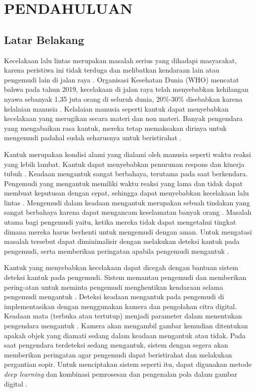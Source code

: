 \chapter{PENDAHULUAN}
\pagestyle{plain}
\section{Latar Belakang}

    Kecelakaan lalu lintas merupakan masalah serius yang dihadapi masyarakat, karena peristiwa ini tidak terduga dan melibatkan kendaraan lain atau pengemudi lain di jalan raya \cite{himawan2022deteksi}. Organisasi Kesehatan Dunia (WHO) mencatat bahwa pada tahun 2019, kecelakaan di jalan raya telah menyebabkan kehilangan nyawa sebanyak 1,35 juta orang di seluruh dunia, 20\%-30\% disebabkan karena kelalaian manusia \cite{kojo2024analisis}. Kelalaian manusia seperti kantuk dapat menyebabkan kecelakaan yang merugikan secara materi dan non materi. Banyak pengendara yang mengabaikan rasa kantuk, mereka tetap memaksakan dirinya untuk mengemudi padahal sudah seharusnya untuk beristirahat   \cite{Puteri2020}.

    Kantuk merupakan kondisi alami yang dialami oleh manusia seperti waktu reaksi yang lebih lambat. Kantuk dapat menyebabkan penurunan respons dan kinerja tubuh \cite{Chaabene2021}. Keadaan mengantuk sangat berbahaya, terutama pada saat berkendara. Pengemudi yang mengantuk memiliki waktu reaksi yang lama dan tidak dapat membuat keputusan dengan cepat, sehingga dapat menyebabkan kecelakaan lalu lintas \cite{Cui2021}. Mengemudi dalam keadaan mengantuk merupakan sebuah tindakan yang sangat berbahaya karena dapat mengancam keselamatan banyak orang \cite{Ngxande2017}. Masalah utama bagi pengemudi yaitu, ketika mereka tidak dapat mengetahui tingkat dimana mereka harus berhenti untuk mengemudi dengan aman. Untuk mengatasi masalah tersebut dapat diminimalisir dengan melakukan deteksi kantuk pada pengemudi, serta memberikan peringatan apabila pengemudi mengantuk \cite{Zhu2022}. 

    Kantuk yang menyebabkan kecelakaan dapat dicegah dengan bantuan sistem deteksi kantuk pada pengemudi. Sistem memantau pengemudi dan memberikan pering-atan untuk meminta pengemudi menghentikan kendaraan selama pengemudi mengantuk \cite{Cui2021}. Deteksi keadaan mengantuk pada pengemudi di implementasikan dengan menggunakan kamera dan pengolahan citra digital. Keadaan mata (terbuka atau tertutup) menjadi parameter dalam menentukan pengendara mengantuk \cite{sethu2023application}. Kamera akan mengambil gambar kemudian ditentukan apakah objek yang diamati sedang dalam keadaan mengantuk atau tidak. Pada saat pengendara terdeteksi sedang mengantuk, sistem dengan segera akan memberikan peringatan agar pengemudi dapat beristirahat dan melakukan pergantian sopir. Untuk menciptakan sistem seperti itu, dapat digunakan metode \textit{deep learning} dan kombinasi pemrosesan dan pengenalan pola dalam gambar digital \cite{Imanuddin2019}.

